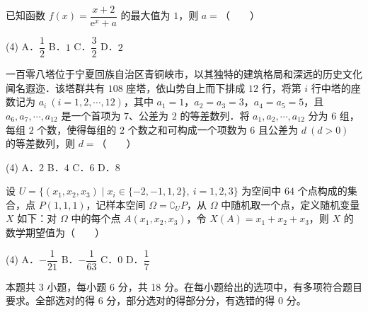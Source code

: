 \begin{question}
已知函数 $f(x)=\dfrac{x+2}{\mathrm{e}^{x}+a}$ 的最大值为 $1$，则 $a=$\mbox{（　　）}

\begin{gkopts}(4)
\task A．$\dfrac{1}{2}$
\task B．$1$
\task C．$\dfrac{3}{2}$
\task D．$2$
\end{gkopts}

\end{question}
\begin{question}
一百零八塔位于宁夏回族自治区青铜峡市，以其独特的建筑格局和深远的历史文化闻名遐迩．该塔群共有 $108$ 座塔，依山势自上而下排成 $12$ 行，将第 $i$ 行中塔的座数记为 $a_i\ (i=1,2,\cdots,12)$，其中 $a_1=1$，$a_2=a_3=3$，$a_4=a_5=5$，且 $a_6,a_7,\cdots,a_{12}$ 是一个首项为 $7$、公差为 $2$ 的等差数列．将 $a_1,a_2,\cdots,a_{12}$ 分为 $6$ 组，每组 $2$ 个数，使得每组的 $2$ 个数之和可构成一个项数为 $6$ 且公差为 $d\ (d>0)$ 的等差数列，则 $d=$\mbox{（　　）}

\begin{gkopts}(4)
\task A．$2$
\task B．$4$
\task C．$6$
\task D．$8$
\end{gkopts}

\end{question}
\begin{question}
设 $U=\{(x_1,x_2,x_3)\mid x_i\in\{-2,-1,1,2\},\ i=1,2,3\}$ 为空间中 $64$ 个点构成的集合，点 $P(1,1,1)$，记样本空间 $\Omega=\complement_U P$，从 $\Omega$ 中随机取一个点，定义随机变量 $X$ 如下：对 $\Omega$ 中的每个点 $A(x_1,x_2,x_3)$，令 $X(A)=x_1+x_2+x_3$，则 $X$ 的数学期望值为\mbox{（　　）}

\begin{gkopts}(4)
\task A．$-\dfrac{1}{21}$
\task B．$-\dfrac{1}{63}$
\task C．$0$
\task D．$\dfrac{1}{7}$
\end{gkopts}

\par\medskip

\end{question}

\begin{gktip}
本题共 3 小题，每小题 6 分，共 18 分。在每小题给出的选项中，有多项符合题目要求。全部选对的得 6 分，部分选对的得部分分，有选错的得 0 分。
\end{gktip}


